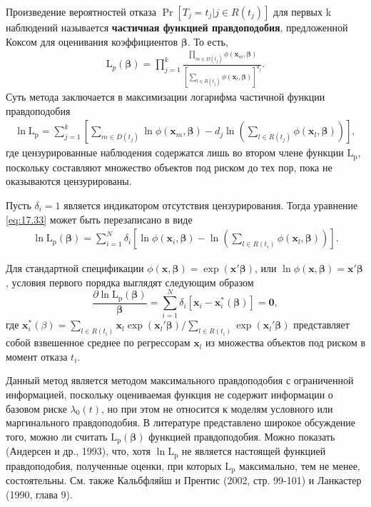 Произведение вероятностей отказа $\Pr\left[T_j=t_j|j\in R(t_j)\right]$ для первых k наблюдений называется \textbf{частичная функцией  правдоподобия}, предложенной Коксом для оценивания коэффициентов $\bm{\beta}$. То есть,
        \begin{align}
        \label{eq:17.32}
        \mathrm{L}_p(\bm{\beta})=\prod^{k}_{j=1}\frac{\prod_{m\in D(t_j)}\phi(\mathbf{x}_m,\bm{\beta})}{\left[\sum_{l\in R(t_j)} \phi(\mathbf{x}_l,\bm{\beta})\right]^{d_j}}.
        \end{align}
Суть метода заключается в максимизации логарифма частичной функции правдоподобия %
        \begin{align}
        \label{eq:17.33}
        \ln\mathrm{L_p}=\sum^{k}_{j=1}\left[\sum_{m\in D(t_j)}\ln\phi(\mathbf{x}_m,\bm{\beta})-d_j\ln\left(\sum_{l\in R(t_j)}\phi(\mathbf{x}_l,\bm{\beta})\right)\right],
        \end{align}
где цензурированные наблюдения содержатся лишь во втором члене функции $\mathrm{L_p}$, поскольку составляют множество объектов под риском до тех пор, пока не оказываются цензурированы.

Пусть $\delta_i = 1$ является индикатором отсутствия цензурирования. Тогда уравнение \ref{eq:17.33} может быть перезаписано в виде
        \begin{align}
        \label{eq:17.34}
        \ln\mathrm{L_p}(\bm{\beta})=\sum^{N}_{i=1}\delta_i\left[\ln\phi(\mathbf{x}_i,\bm{\beta})-\ln\left(\sum_{l\in R(t_i)}\phi(\mathbf{x}_l,\bm{\beta})\right)\right].
        \end{align}

Для стандартной спецификации $\phi(\mathbf{x},\bm{\beta})=\exp(\mathbf{x}'\bm{\beta})$, или $\ln\phi(\mathbf{x},\bm{\beta})=\mathbf{x}'\bm{\beta}$, условия первого порядка выглядят следующим образом
        $$\frac{\partial\ln\mathrm{L_p}(\bm{\beta})}{\bm{\beta}}=\sum^{N}_{i=1}\delta_i[\mathbf{x}_i-\mathbf{x}^*_i(\bm{\beta})]=\mathbf{0},$$
где $\mathbf{x}^*_i (\beta)=\sum_{l\in R(t_i)}\mathbf{x}_l\exp(\mathbf{x}_l'\bm{\beta})/\sum_{l\in R(t_i)}\exp(\mathbf{x}_l'\bm{\beta})$ представляет собой взвешенное среднее по регрессорам $\mathbf{x}_l$ из множества объектов под риском в момент отказа $t_i$.

Данный метод является методом максимального правдоподобия с ограниченной информацией, поскольку оцениваемая функция не содержит информации о базовом риске $\lambda_0(t)$, но при этом не относится к моделям условного или маргинального правдоподобия. В литературе представлено широкое обсуждение того, можно ли считать $\mathrm{L_p}(\bm{\beta})$ функцией правдоподобия. Можно показать (Андерсен и др., 1993), что, хотя $\ln \mathrm{L_p}$ не является настоящей функцией правдоподобия, полученные оценки, при которых $\mathrm{L_p}$ максимально, тем не менее, состоятельны. См. также Кальбфляйш и Прентис (2002, стр. 99-101) и Ланкастер (1990, глава 9).

